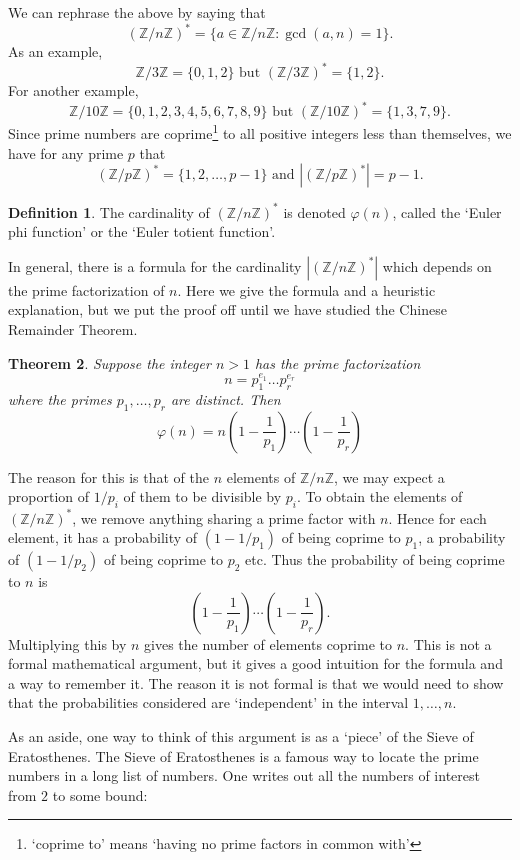 \documentclass{article}
\theoremstyle{plain}
\newtheorem{theorem}{Theorem}
\theoremstyle{definition}
\newtheorem{definition}[theorem]{Definition}
\theoremstyle{remark}
\numberwithin{theorem}{section}
\newcommand{\ZZ}{\mathbb{Z}}
\begin{document}
We can rephrase the above by saying that
\[
	(\ZZ/n\ZZ)^* = \{ a \in \ZZ/n\ZZ : \gcd(a,n)=1 \}.
\]
As an example,
\[
	\ZZ/3\ZZ = \{0,1,2\} \text{ but }
	(\ZZ/3\ZZ)^* = \{1,2\}.
\]
For another example,
\[
	\ZZ/10\ZZ = \{0,1,2,3,4,5,6,7,8,9\} \text{ but }
	(\ZZ/10\ZZ)^* = \{1,3,7,9\}.
\]
Since prime numbers are coprime\footnote{`coprime to' means `having no prime factors in common with'} to all positive integers less than themselves, we have for any prime $p$ that
\[
	(\ZZ/p\ZZ)^* = \{ 1,2,\ldots,p-1\} \text{ and } |(\ZZ/p\ZZ)^*| = p-1.
\]
\begin{definition}
	The cardinality of $(\ZZ/n\ZZ)^*$ is denoted $\varphi(n)$, called the `Euler phi function' or the `Euler totient function'.
\end{definition}

In general, there is a formula for the cardinality $|(\ZZ/n\ZZ)^*|$ which depends on the prime factorization of $n$.  Here we give the formula and a heuristic explanation, but we put the proof off until we have studied the Chinese Remainder Theorem.

\begin{theorem}
	Suppose the integer $n > 1$ has the prime factorization
	\[
		n = p_1^{e_1} \ldots p_r^{e_r}
	\]
 where the primes $p_1, \ldots, p_r$ are distinct.
	Then
\[
	\varphi(n) = n 
	\left( 1 - \frac{1}{p_1} \right)
	\cdots
	\left( 1 - \frac{1}{p_r} \right)
\]
\end{theorem}

The reason for this is that of the $n$ elements of $\ZZ/n\ZZ$, we may expect a proportion of $1/p_i$ of them to be divisible by $p_i$.  To obtain the elements of $(\ZZ/n\ZZ)^*$, we remove anything sharing a prime factor with $n$.  Hence for each element, it has a probability of $(1 - 1/p_1)$ of being coprime to $p_1$, a probability of $(1-1/p_2)$ of being coprime to $p_2$ etc.  Thus the probability of being coprime to $n$ is
\[
	\left( 1 - \frac{1}{p_1} \right)
	\cdots
	\left( 1 - \frac{1}{p_r} \right).
\]
Multiplying this by $n$ gives the number of elements coprime to $n$.  This is not a formal mathematical argument, but it gives a good intuition for the formula and a way to remember it.  The reason it is not formal is that we would need to show that the probabilities considered are `independent' in the interval $1, \ldots, n$.

As an aside, one way to think of this argument is as a `piece' of the Sieve of Eratosthenes.  The Sieve of Eratosthenes is a famous way to locate the prime numbers in a long list of numbers.  One writes out all the numbers of interest from $2$ to some bound:
\end{document}
